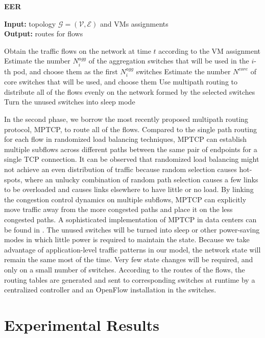 \documentclass[journal,single-space,two column,twoside,10pt]{IEEEtran}
\begin{document}
\begin{algorithm}[!t]
\caption{\label{alg:eer} \textbf{EER}}
\textbf{Input: } topology $\mathcal{G}=(\mathcal{V},\mathcal{E})$ and VMs assignments\\
\textbf{Output: } routes for flows

\begin{algorithmic}[1]
\STATE Obtain the traffic flows on the network at time $t$ according to the VM assignment
	\STATE Estimate the number $N_{i}^{agg}$ of the aggregation switches that will be used in the $i$-th pod, and choose them as the first $N_i^{agg}$ switches
\ENDFOR
\STATE Estimate the number $N^{core}$ of core switches that will be used, and choose them
\STATE Use multipath routing to distribute all of the flows evenly on the network formed by the selected switches
\STATE Turn the unused switches into sleep mode
\ENDFOR
\end{algorithmic}
\end{algorithm}

In the second phase, we borrow the most recently proposed multipath routing protocol, MPTCP, to route all of the flows. Compared to the single path routing for each flow in randomized load balancing techniques, MPTCP can establish multiple subflows across different paths between the same pair of endpoints for a single TCP connection. It can be observed that randomized load balancing might not achieve an even distribution of traffic because random selection causes hot-spots, where an unlucky combination of random path selection causes a few links to be overloaded and causes links elsewhere to have little or no load. By linking the congestion control dynamics on multiple subflows, MPTCP can explicitly move traffic away from the more congested paths and place it on the less congested paths. A sophisticated implementation of MPTCP in data centers can be found in \cite{Raiciu_Barre-2011}. The unused switches will be turned into sleep or other power-saving modes in which little power is required to maintain the state.
Because we take advantage of application-level traffic patterns in our model, the network state will remain the same most of the time. Very few state changes will be required, and only on a small number of switches. According to the routes of the flows, the routing tables are generated and sent to corresponding switches at runtime by a centralized controller and an OpenFlow installation in the switches.


\section{Experimental Results}
\label{sec:evaluation}
\end{document}
